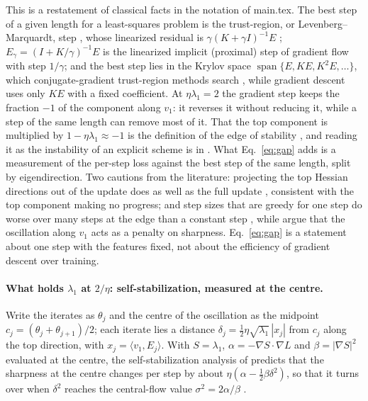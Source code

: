 \documentclass[11pt]{article}
\theoremstyle{definition}
\theoremstyle{remark}
\newcommand{\ip}[2]{\langle #1,#2\rangle}
\begin{document}
This is a restatement of classical facts in the notation of main.tex.
The best step of a given length for a least-squares problem is the trust-region, or Levenberg--Marquardt, step \cite{levenberg1944,marquardt1963,more1978}, whose linearized residual is $\gamma(K + \gamma I)^{-1}E$ \cite{hanke1997}; $E_\gamma = (I + K/\gamma)^{-1}E$ is the linearized implicit (proximal) step of gradient flow with step $1/\gamma$; and the best step lies in the Krylov space $\operatorname{span}\{E, KE, K^2E,\dots\}$, which conjugate-gradient trust-region methods search \cite{steihaug1983,martens2010}, while gradient descent uses only $KE$ with a fixed coefficient.
At $\eta\lambda_1 = 2$ the gradient step keeps the fraction $-1$ of the component along $v_1$: it reverses it without reducing it, while a step of the same length can remove most of it.
That the top component is multiplied by $1 - \eta\lambda_1\approx-1$ is the definition of the edge of stability \cite{cohen2021}, and reading it as the instability of an explicit scheme is in \cite{sun2022}.
What Eq.~\eqref{eq:gap} adds is a measurement of the per-step loss against the best step of the same length, split by eigendirection.
Two cautions from the literature: projecting the top Hessian directions out of the update does as well as the full update \cite{songahnyun2025}, consistent with the top component making no progress; and step sizes that are greedy for one step do worse over many steps at the edge than a constant step \cite{roulet2024}, while \cite{cohen2025} argue that the oscillation along $v_1$ acts as a penalty on sharpness. Eq.~\eqref{eq:gap} is a statement about one step with the features fixed, not about the efficiency of gradient descent over training.

\paragraph{What holds $\lambda_1$ at $2/\eta$: self-stabilization, measured at the centre.}
Write the iterates as $\theta_j$ and the centre of the oscillation as the midpoint $c_j = (\theta_j + \theta_{j+1})/2$; each iterate lies a distance $\delta_j = \frac12\eta\sqrt{\lambda_1}\,|x_j|$ from $c_j$ along the top direction, with $x_j = \ip{v_1}{E_j}$.
With $S = \lambda_1$, $\alpha = -\nabla S\cdot\nabla L$ and $\beta = |\nabla S|^2$ evaluated at the centre, the self-stabilization analysis of \cite{damian2023} predicts that the sharpness at the centre changes per step by about $\eta(\alpha - \frac12\beta\delta^2)$, so that it turns over when $\delta^2$ reaches the central-flow value $\sigma^2 = 2\alpha/\beta$ \cite{cohen2025}.
\end{document}
